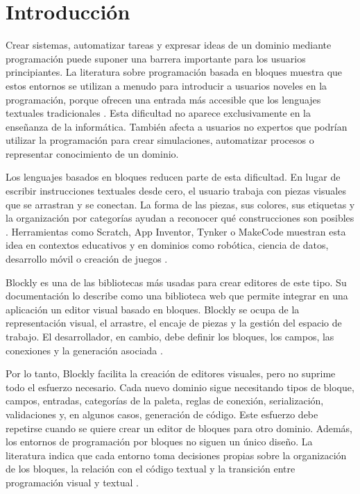 \chapter{Introducción}
\label{chap:introduccion}

Crear sistemas, automatizar tareas y expresar ideas de un dominio mediante
programación puede suponer una barrera importante para los usuarios principiantes.
La literatura sobre programación basada en bloques muestra que estos entornos
se utilizan a menudo para introducir a usuarios noveles en la
programación, porque ofrecen una entrada más accesible que los lenguajes
textuales tradicionales \cite{lin2021landscape}. Esta dificultad no aparece
exclusivamente en la enseñanza de la informática. También afecta a usuarios
no expertos que podrían utilizar la programación para crear simulaciones,
automatizar procesos o representar conocimiento de un dominio.

Los lenguajes basados en bloques reducen parte de esta dificultad. En lugar de
escribir instrucciones textuales desde cero, el usuario trabaja con piezas
visuales que se arrastran y se conectan. La forma de las piezas, sus colores, sus
etiquetas y la organización por categorías ayudan a reconocer qué construcciones
son posibles \cite{weintrop2018modalities}. Herramientas como Scratch, App
Inventor, Tynker o MakeCode muestran esta idea en contextos educativos y en
dominios como robótica, ciencia de datos, desarrollo móvil o creación de juegos
\cite{lin2021landscape}.

Blockly es una de las bibliotecas más usadas para crear editores de este tipo.
Su documentación lo describe como una biblioteca web que permite integrar en una
aplicación un editor visual basado en bloques. Blockly se ocupa de la
representación visual, el arrastre, el encaje de piezas y la gestión del
espacio de trabajo. El desarrollador, en cambio, debe definir los bloques, los campos, las
conexiones y la generación asociada \cite{blocklyWhatIs,blocklyDocs}.

Por lo tanto, Blockly facilita la creación de editores visuales, pero no suprime
todo el esfuerzo necesario. Cada nuevo dominio sigue necesitando tipos de bloque, campos,
entradas, categorías de la paleta, reglas de conexión, serialización,
validaciones y, en algunos casos, generación de código. Este esfuerzo debe
repetirse cuando se quiere crear un editor de bloques para otro dominio. Además, los
entornos de programación por bloques no siguen un único diseño. La literatura
indica que cada entorno toma decisiones propias sobre la organización de los
bloques, la relación con el código textual y la transición entre programación
visual y textual \cite{lin2021landscape,weintrop2018modalities}.

